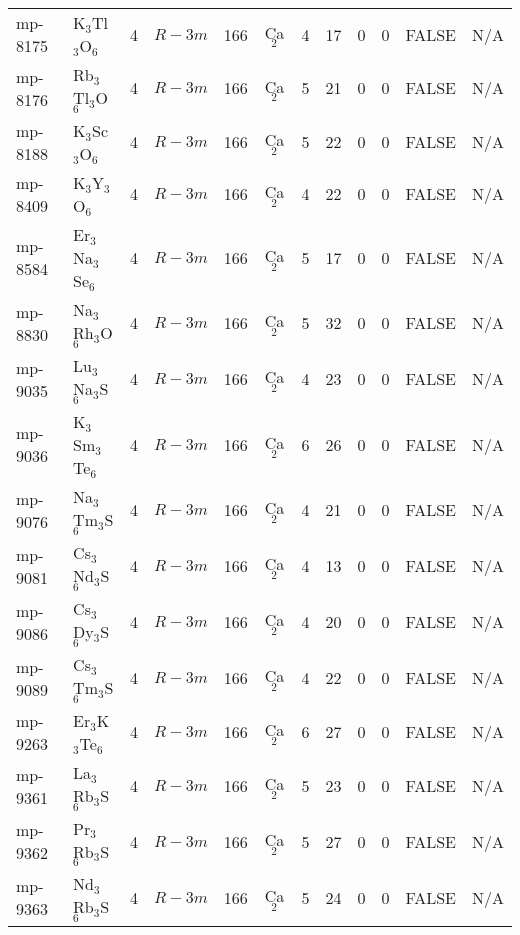 {\begin{longtable}{llcccccccccc}
    mp-8175 & K$_{3}$Tl$_{3}$O$_{6}$ & 4     & $R-3m$ & 166   & Ca$_{2}$ & 4     & 17    & 0     & 0     & FALSE & N/A \\
    mp-8176 & Rb$_{3}$Tl$_{3}$O$_{6}$ & 4     & $R-3m$ & 166   & Ca$_{2}$ & 5     & 21    & 0     & 0     & FALSE & N/A \\
    mp-8188 & K$_{3}$Sc$_{3}$O$_{6}$ & 4     & $R-3m$ & 166   & Ca$_{2}$ & 5     & 22    & 0     & 0     & FALSE & N/A \\
    mp-8409 & K$_{3}$Y$_{3}$O$_{6}$ & 4     & $R-3m$ & 166   & Ca$_{2}$ & 4     & 22    & 0     & 0     & FALSE & N/A \\
    mp-8584 & Er$_{3}$Na$_{3}$Se$_{6}$ & 4     & $R-3m$ & 166   & Ca$_{2}$ & 5     & 17    & 0     & 0     & FALSE & N/A \\
    mp-8830 & Na$_{3}$Rh$_{3}$O$_{6}$ & 4     & $R-3m$ & 166   & Ca$_{2}$ & 5     & 32    & 0     & 0     & FALSE & N/A \\
    mp-9035 & Lu$_{3}$Na$_{3}$S$_{6}$ & 4     & $R-3m$ & 166   & Ca$_{2}$ & 4     & 23    & 0     & 0     & FALSE & N/A \\
    mp-9036 & K$_{3}$Sm$_{3}$Te$_{6}$ & 4     & $R-3m$ & 166   & Ca$_{2}$ & 6     & 26    & 0     & 0     & FALSE & N/A \\
    mp-9076 & Na$_{3}$Tm$_{3}$S$_{6}$ & 4     & $R-3m$ & 166   & Ca$_{2}$ & 4     & 21    & 0     & 0     & FALSE & N/A \\
    mp-9081 & Cs$_{3}$Nd$_{3}$S$_{6}$ & 4     & $R-3m$ & 166   & Ca$_{2}$ & 4     & 13    & 0     & 0     & FALSE & N/A \\
    mp-9086 & Cs$_{3}$Dy$_{3}$S$_{6}$ & 4     & $R-3m$ & 166   & Ca$_{2}$ & 4     & 20    & 0     & 0     & FALSE & N/A \\
    mp-9089 & Cs$_{3}$Tm$_{3}$S$_{6}$ & 4     & $R-3m$ & 166   & Ca$_{2}$ & 4     & 22    & 0     & 0     & FALSE & N/A \\
    mp-9263 & Er$_{3}$K$_{3}$Te$_{6}$ & 4     & $R-3m$ & 166   & Ca$_{2}$ & 6     & 27    & 0     & 0     & FALSE & N/A \\
    mp-9361 & La$_{3}$Rb$_{3}$S$_{6}$ & 4     & $R-3m$ & 166   & Ca$_{2}$ & 5     & 23    & 0     & 0     & FALSE & N/A \\
    mp-9362 & Pr$_{3}$Rb$_{3}$S$_{6}$ & 4     & $R-3m$ & 166   & Ca$_{2}$ & 5     & 27    & 0     & 0     & FALSE & N/A \\
    mp-9363 & Nd$_{3}$Rb$_{3}$S$_{6}$ & 4     & $R-3m$ & 166   & Ca$_{2}$ & 5     & 24    & 0     & 0     & FALSE & N/A \\

\end{longtable}}
